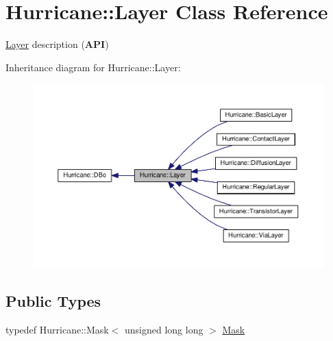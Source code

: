 \hypertarget{classHurricane_1_1Layer}{}\section{Hurricane\+:\+:Layer Class Reference}
\label{classHurricane_1_1Layer}


\mbox{\hyperlink{classHurricane_1_1Layer}{Layer}} description ({\bfseries A\+PI})  




Inheritance diagram for Hurricane\+:\+:Layer\+:\nopagebreak
\begin{figure}[H]
\begin{center}
\leavevmode
\includegraphics[width=350pt]{classHurricane_1_1Layer__inherit__graph}
\end{center}
\end{figure}
\subsection*{Public Types}
\begin{DoxyCompactItemize}
\item 
typedef Hurricane\+::\+Mask$<$ unsigned long long $>$ \mbox{\hyperlink{classHurricane_1_1Layer_af5277c670637bd5d910237e7afe01a91}{Mask}}
\end{DoxyCompactItemize}
